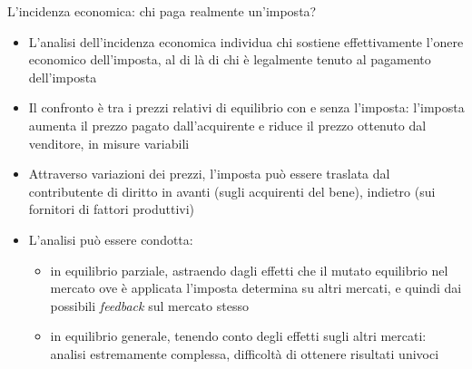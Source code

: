 \documentclass[aspectratio=64,11pt]{beamer}
\begin{document}
\begin{frame}{L'incidenza economica: chi paga realmente un'imposta?}
\begin{itemize}
\item L'analisi dell'incidenza economica individua chi sostiene effettivamente
l'onere economico dell'imposta, al di là di chi è legalmente tenuto al
pagamento dell'imposta
\item Il confronto è tra i \alert{prezzi relativi} di equilibrio con e senza l'imposta:
l'imposta aumenta il prezzo pagato dall'acquirente e riduce il prezzo
ottenuto dal venditore, in misure variabili
\item Attraverso variazioni dei prezzi, l'imposta può essere traslata dal
contributente di diritto \alert{in avanti} (sugli acquirenti del bene), \alert{indietro}
(sui fornitori di fattori produttivi)
\item L'analisi può essere condotta:
\begin{itemize}
\item in \alert{equilibrio parziale}, astraendo dagli effetti che il mutato equilibrio
nel mercato ove è applicata l'imposta determina su altri mercati, e quindi
dai possibili \emph{feedback} sul mercato stesso
\item in \alert{equilibrio generale}, tenendo conto degli effetti sugli altri mercati:
analisi estremamente complessa, difficoltà di ottenere risultati univoci
\end{itemize}
\end{itemize}
\end{frame}
\end{document}
